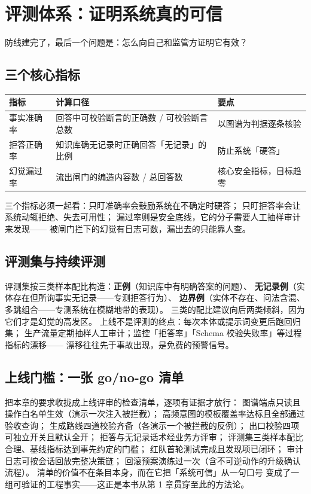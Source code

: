 \section{评测体系：证明系统真的可信}

防线建完了，最后一个问题是：怎么向自己和监管方证明它有效？

\subsection{三个核心指标}

\begin{center}
\begin{tabularx}{\linewidth}{@{}lXX@{}}
\toprule
\textbf{指标} & \textbf{计算口径} & \textbf{要点} \\
\midrule
事实准确率 & 回答中可校验断言的正确数 / 可校验断言总数 & 以图谱为判据逐条核验 \\
拒答正确率 & 知识库确无记录时正确回答「无记录」的比例 & 防止系统「硬答」 \\
幻觉漏过率 & 流出闸门的编造内容数 / 总回答数 & 核心安全指标，目标趋零 \\
\bottomrule
\end{tabularx}
\end{center}

三个指标必须一起看：只盯准确率会鼓励系统在不确定时硬答；
只盯拒答率会让系统动辄拒绝、失去可用性；
漏过率则是安全底线，它的分子需要人工抽样审计来发现——
被闸门拦下的幻觉有日志可数，漏出去的只能靠人查。

\subsection{评测集与持续评测}

评测集按三类样本配比构造：\textbf{正例}（知识库中有明确答案的问题）、
\textbf{无记录例}（实体存在但所询事实无记录——专测拒答行为）、
\textbf{边界例}（实体不存在、问法含混、多跳组合——专测系统在模糊地带的表现）。
三类的配比建议向后两类倾斜，因为它们才是幻觉的高发区。
上线不是评测的终点：每次本体或提示词变更后跑回归集；
生产流量定期抽样人工审计；监控「拒答率」「Schema 校验失败率」等过程指标的漂移——
漂移往往先于事故出现，是免费的预警信号。

\subsection{上线门槛：一张 go/no-go 清单}

把本章的要求收拢成上线评审的检查清单，逐项有证据才放行：
图谱端点只读且操作白名单生效（演示一次注入被拦截）；
高频意图的模板覆盖率达标且全部通过验收查询；
生成路线四道校验齐备（各演示一个被拦截的反例）；
出口校验四项可独立开关且默认全开；
拒答与无记录话术经业务方评审；
评测集三类样本配比合理、基线指标达到事先约定的门槛；
红队首轮测试完成且发现项已闭环；
审计日志可按会话回放完整决策链；
回滚预案演练过一次（含不可逆动作的升级确认流程）。
清单的价值不在条目本身，而在它把「系统可信」从一句口号
变成了一组可验证的工程事实——这正是本书从第 1 章贯穿至此的方法论。

